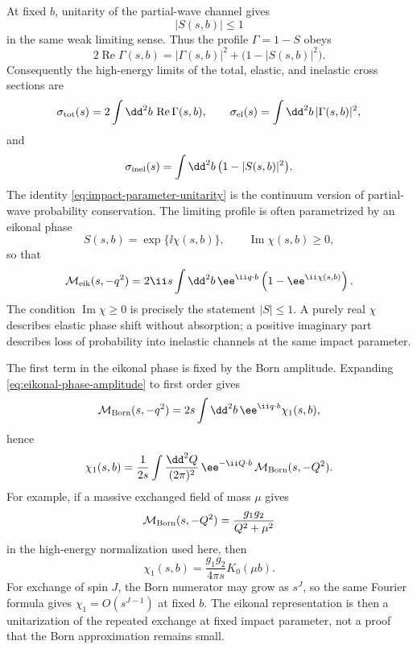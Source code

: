 At fixed \(b\), unitarity of the partial-wave channel gives
\[
  |S(s,b)|\le1
\]
in the same weak limiting sense.  Thus the profile
\(\Gamma=1-S\) obeys
\begin{equation}
  2\operatorname{Re}\Gamma(s,b)
  =
  |\Gamma(s,b)|^2+\bigl(1-|S(s,b)|^2\bigr).
  \label{eq:impact-parameter-unitarity}
\end{equation}
Consequently the high-energy limits of the total, elastic, and inelastic
cross sections are
\begin{equation}
  \sigma_{\rm tot}(s)
  =
  2\int\dd^2b\,\operatorname{Re}\Gamma(s,b),
  \qquad
  \sigma_{\rm el}(s)
  =
  \int\dd^2b\,|\Gamma(s,b)|^2,
  \label{eq:impact-parameter-total-elastic}
\end{equation}
and
\[
  \sigma_{\rm inel}(s)
  =
  \int\dd^2b\,\bigl(1-|S(s,b)|^2\bigr).
\]
The identity \eqref{eq:impact-parameter-unitarity} is the continuum version of
partial-wave probability conservation.  The limiting profile is often
parametrized by an eikonal phase
\[
  S(s,b)=\exp\{\ii\chi(s,b)\},
  \qquad
  \operatorname{Im}\chi(s,b)\ge0,
\]
so that
\begin{equation}
  \mathcal M_{\rm eik}(s,-q^2)
  =
  2\ii s\int\dd^2b\,
  \ee^{\ii q\cdot b}
  \left(1-\ee^{\ii\chi(s,b)}\right).
  \label{eq:eikonal-phase-amplitude}
\end{equation}
The condition \(\operatorname{Im}\chi\ge0\) is precisely the statement
\(|S|\le1\).  A purely real \(\chi\) describes elastic phase shift without
absorption; a positive imaginary part describes loss of probability into
inelastic channels at the same impact parameter.

The first term in the eikonal phase is fixed by the Born amplitude.  Expanding
\eqref{eq:eikonal-phase-amplitude} to first order gives
\[
  \mathcal M_{\rm Born}(s,-q^2)
  =
  2s\int\dd^2b\,\ee^{\ii q\cdot b}\chi_1(s,b),
\]
hence
\begin{equation}
  \chi_1(s,b)
  =
  \frac{1}{2s}
  \int\frac{\dd^2Q}{(2\pi)^2}\,
  \ee^{-\ii Q\cdot b}\,
  \mathcal M_{\rm Born}(s,-Q^2).
  \label{eq:first-eikonal-phase-born-transform}
\end{equation}
For example, if a massive exchanged field of mass \(\mu\) gives
\[
  \mathcal M_{\rm Born}(s,-Q^2)
  =
  \frac{g_1g_2}{Q^2+\mu^2}
\]
in the high-energy normalization used here, then
\[
  \chi_1(s,b)
  =
  \frac{g_1g_2}{4\pi s}K_0(\mu b).
\]
For exchange of spin \(J\), the Born numerator may grow as \(s^J\), so the
same Fourier formula gives \(\chi_1=O(s^{J-1})\) at fixed \(b\).  The
eikonal representation is then a unitarization of the repeated exchange at
fixed impact parameter, not a proof that the Born approximation remains small.

